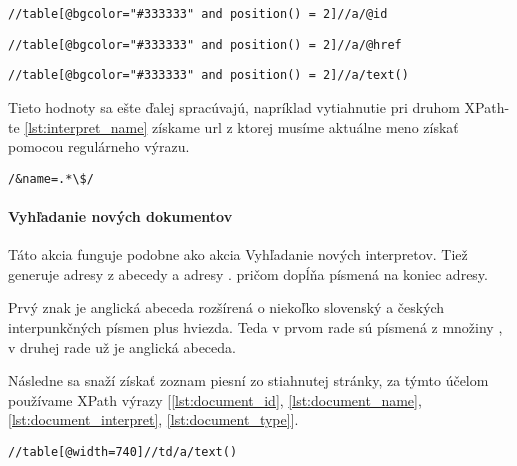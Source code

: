 \begin{lstlisting}[caption=XPath na vyhľadanie interpretovho identifikátora,
    label=lst:interpret_id]
//table[@bgcolor="#333333" and position() = 2]//a/@id
\end{lstlisting}

\begin{lstlisting}[caption=XPath na vyhľadanie interpretovho mena,label=lst:interpret_name]
//table[@bgcolor="#333333" and position() = 2]//a/@href
\end{lstlisting}

\begin{lstlisting}[caption=XPath na vyhľadanie interpretovho aliasu,label=lst:interpret_alias]
//table[@bgcolor="#333333" and position() = 2]//a/text()
\end{lstlisting}

Tieto hodnoty sa ešte ďalej spracúvajú, napríklad vytiahnutie pri druhom XPath-te
\ref{lst:interpret_name} 
získame url z ktorej musíme aktuálne meno získať pomocou regulárneho výrazu.

\begin{lstlisting}[caption=Regulárny výraz na získanie mena interpreta z url interpreta,
    label=lst:regex_interpret_name]
/&name=.*\$/
\end{lstlisting}

\paragraph{Vyhľadanie nových dokumentov}

Táto akcia funguje podobne ako akcia Vyhľadanie nových interpretov. Tiež generuje adresy
z abecedy a adresy .
pričom dopĺňa písmená na koniec adresy.

Prvý znak je anglická abeceda rozšírená o niekoľko slovenský a českých interpunkčných písmen
plus hviezda. Teda v prvom rade sú písmená z množiny ,
v druhej rade už je anglická abeceda.

Následne sa snaží získať zoznam piesní zo stiahnutej stránky, za týmto účelom používame
XPath výrazy [\ref{lst:document_id}, \ref{lst:document_name}, \ref{lst:document_interpret}, 
\ref{lst:document_type}].

\begin{lstlisting}[caption=XPath na vyhľadanie názvov piesní,label=lst:document_name]
//table[@width=740]//td/a/text()
\end{lstlisting}

